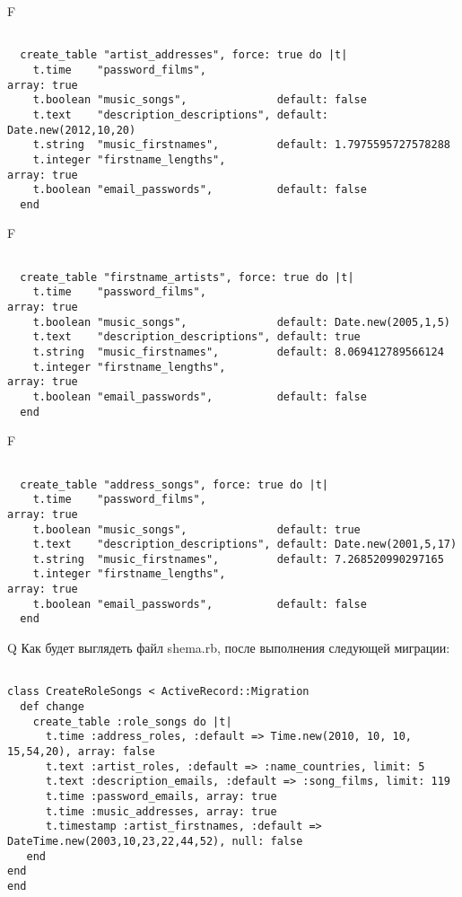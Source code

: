 F
\begin{verbatim}

  create_table "artist_addresses", force: true do |t|
    t.time    "password_films",                                       array: true
    t.boolean "music_songs",              default: false
    t.text    "description_descriptions", default: Date.new(2012,10,20)
    t.string  "music_firstnames",         default: 1.7975595727578288
    t.integer "firstname_lengths",                                    array: true
    t.boolean "email_passwords",          default: false
  end

\end{verbatim}

F
\begin{verbatim}

  create_table "firstname_artists", force: true do |t|
    t.time    "password_films",                                       array: true
    t.boolean "music_songs",              default: Date.new(2005,1,5)
    t.text    "description_descriptions", default: true
    t.string  "music_firstnames",         default: 8.069412789566124
    t.integer "firstname_lengths",                                    array: true
    t.boolean "email_passwords",          default: false
  end

\end{verbatim}

F
\begin{verbatim}

  create_table "address_songs", force: true do |t|
    t.time    "password_films",                                       array: true
    t.boolean "music_songs",              default: true
    t.text    "description_descriptions", default: Date.new(2001,5,17)
    t.string  "music_firstnames",         default: 7.268520990297165
    t.integer "firstname_lengths",                                    array: true
    t.boolean "email_passwords",          default: false
  end

\end{verbatim}

Q
Как будет выглядеть файл shema.rb, после выполнения следующей миграции:

\begin{verbatim}

class CreateRoleSongs < ActiveRecord::Migration 
  def change 
    create_table :role_songs do |t| 
      t.time :address_roles, :default => Time.new(2010, 10, 10, 15,54,20), array: false
      t.text :artist_roles, :default => :name_countries, limit: 5
      t.text :description_emails, :default => :song_films, limit: 119
      t.time :password_emails, array: true
      t.time :music_addresses, array: true
      t.timestamp :artist_firstnames, :default => DateTime.new(2003,10,23,22,44,52), null: false
   end
end
end
\end{verbatim}

